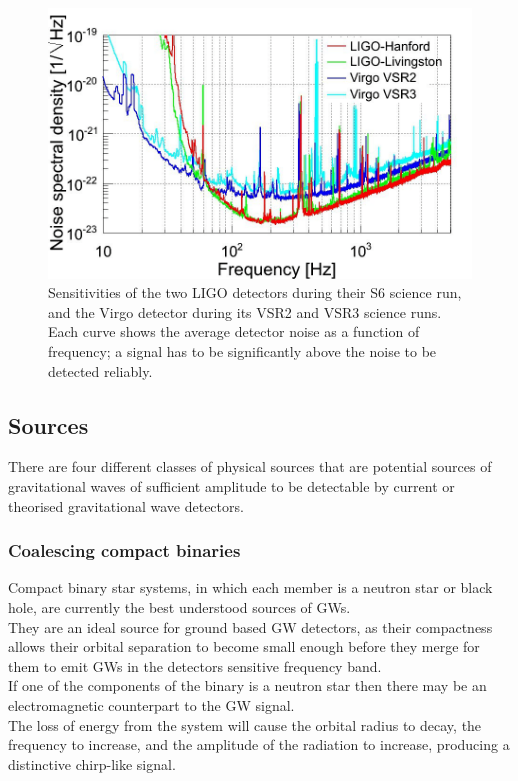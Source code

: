 \documentclass[binding=0.6cm, LaM]{sapthesis}
\begin{document}
		\begin{figure}
                	\includegraphics[scale=0.3]{noiseone}
                	\centering
                	\caption{Sensitivities of the two LIGO detectors during their S6 science run, 
				 and the Virgo detector during its VSR2 and VSR3 science runs. 
				 Each curve shows the average detector noise as a function of frequency; 
				 a signal has to be significantly above the noise to be detected reliably.}
                	\label{fig:noiseone}
                \end{figure}

\subsection{Sources}

	There are four different classes of physical sources 
	that are potential sources of gravitational waves 
	of sufficient amplitude to be detectable 
	by current or theorised gravitational wave detectors. 

\subsubsection{Coalescing compact binaries}

	Compact binary star systems, in which each member is a neutron star or black hole, 
	are currently the best understood sources of GWs. \\
	They are an ideal source for ground based GW detectors, 
	as their compactness allows their orbital separation to become 
	small enough before they merge for them to emit GWs in the detectors sensitive frequency band. \\
	If one of the components of the binary is a neutron star 
	then there may be an electromagnetic counterpart to the GW signal. \\
	The loss of energy from the system will cause the orbital radius to decay, 
	the frequency to increase, and the amplitude of the radiation to increase, 
	producing a distinctive chirp-like signal. 
	
\end{document}

